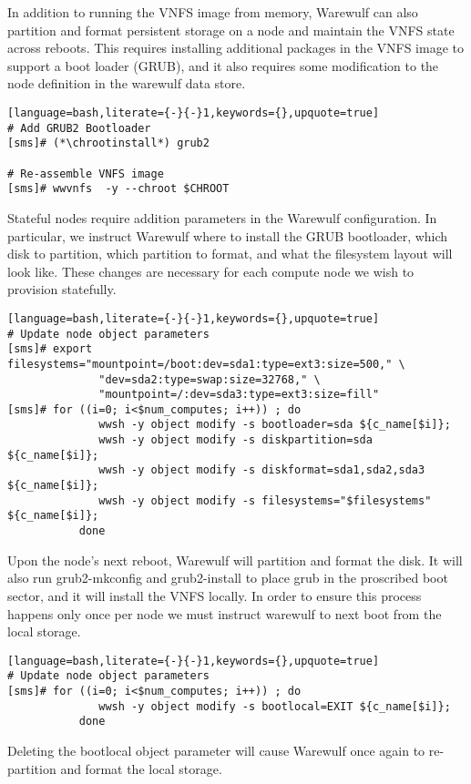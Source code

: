 In addition to running the VNFS image from memory, Warewulf can also partition
and format persistent storage on a node and maintain the VNFS state across
reboots. This requires installing additional packages in the VNFS image to
support a boot loader (GRUB), and it also requires some modification to the
node definition in the warewulf data store. 

\begin{lstlisting}[language=bash,literate={-}{-}1,keywords={},upquote=true]
# Add GRUB2 Bootloader
[sms]# (*\chrootinstall*) grub2

# Re-assemble VNFS image
[sms]# wwvnfs  -y --chroot $CHROOT
\end{lstlisting}

Stateful nodes require addition parameters in the Warewulf configuration. In
particular, we instruct Warewulf where to install the GRUB bootloader, which
disk to partition, which partition to format, and what the filesystem layout
will look like. These changes are necessary for each compute node we wish to
provision statefully.

\begin{lstlisting}[language=bash,literate={-}{-}1,keywords={},upquote=true]
# Update node object parameters
[sms]# export filesystems="mountpoint=/boot:dev=sda1:type=ext3:size=500," \
              "dev=sda2:type=swap:size=32768," \
              "mountpoint=/:dev=sda3:type=ext3:size=fill"
[sms]# for ((i=0; i<$num_computes; i++)) ; do 
              wwsh -y object modify -s bootloader=sda ${c_name[$i]};
              wwsh -y object modify -s diskpartition=sda ${c_name[$i]};
              wwsh -y object modify -s diskformat=sda1,sda2,sda3 ${c_name[$i]};
              wwsh -y object modify -s filesystems="$filesystems" ${c_name[$i]};
           done
\end{lstlisting}

Upon the node's next reboot, Warewulf will partition and format the disk. It
will also run grub2-mkconfig and grub2-install to place grub in the proscribed
boot sector, and it will install the VNFS locally. In order to ensure this 
process happens only once per node we must instruct warewulf to next boot from 
the local storage.

\begin{lstlisting}[language=bash,literate={-}{-}1,keywords={},upquote=true]
# Update node object parameters
[sms]# for ((i=0; i<$num_computes; i++)) ; do 
              wwsh -y object modify -s bootlocal=EXIT ${c_name[$i]};
           done
\end{lstlisting}

Deleting the bootlocal object parameter will cause Warewulf once again to
re-partition and format the local storage.
